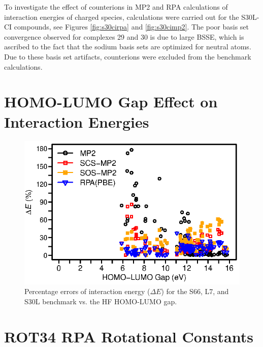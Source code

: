 \documentclass[journal=jctcce,manuscript=article]{achemso}
\begin{document}
To investigate the effect of counterions in MP2 and RPA calculations of
interaction energies of charged species, calculations were carried out for the
S30L-CI compounds, see Figures \ref{fig:s30cirpa} and \ref{fig:s30cimp2}.
The poor basis set convergence observed for complexes 29 and 30 is due to
large BSSE, which is ascribed to the fact that the sodium basis sets are
optimized for neutral atoms. Due to these basis set artifacts, counterions
were excluded from the benchmark calculations.

\section{HOMO-LUMO Gap Effect on Interaction Energies}

\begin{figure}[H]
  \centering
  \includegraphics{homo_lumo_compare.eps}
  \caption{Percentage errors of interaction energy ($\Delta E$) for
    the S66,\cite{doi:10.1021/ct2002946,doi:10.1021/ct200523a}
    L7,\cite{doi:10.1021/ct400036b} and S30L\cite{Sure15JChemTheoryComput}
    benchmark vs. the HF HOMO-LUMO gap.} 
\end{figure}

\section{ROT34 RPA Rotational Constants}
\end{document}
